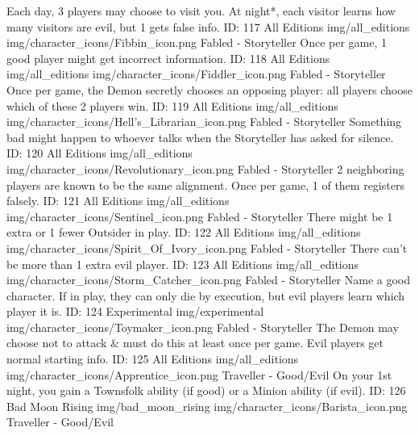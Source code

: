 	{Each day, 3 players may choose to visit you. At night*, each visitor learns how many visitors are evil, but 1 gets false info.}        
	{ID: 117}
	{All Editions}
	{img/all_editions}
	{img/character_icons/Fibbin_icon.png}
	{\color{storytellercolor}Fabled - Storyteller}
	{Once per game, 1 good player might get incorrect information.}        
	{ID: 118}
	{All Editions}
	{img/all_editions}
	{img/character_icons/Fiddler_icon.png}
	{\color{storytellercolor}Fabled - Storyteller}
	{Once per game, the Demon secretly chooses an opposing player: all players choose which of these 2 players win.}        
	{ID: 119}
	{All Editions}
	{img/all_editions}
	{img/character_icons/Hell's_Librarian_icon.png}
	{\color{storytellercolor}Fabled - Storyteller}
	{Something bad might happen to whoever talks when the Storyteller has asked for silence.}        
	{ID: 120}
	{All Editions}
	{img/all_editions}
	{img/character_icons/Revolutionary_icon.png}
	{\color{storytellercolor}Fabled - Storyteller}
	{2 neighboring players are known to be the same alignment. Once per game, 1 of them registers falsely.}        
	{ID: 121}
	{All Editions}
	{img/all_editions}
	{img/character_icons/Sentinel_icon.png}
	{\color{storytellercolor}Fabled - Storyteller}
	{There might be 1 extra or 1 fewer Outsider in play.}        
	{ID: 122}
	{All Editions}
	{img/all_editions}
	{img/character_icons/Spirit_Of_Ivory_icon.png}
	{\color{storytellercolor}Fabled - Storyteller}
	{There can't be more than 1 extra evil player.}        
	{ID: 123}
	{All Editions}
	{img/all_editions}
	{img/character_icons/Storm_Catcher_icon.png}
	{\color{storytellercolor}Fabled - Storyteller}
	{Name a good character. If in play, they can only die by execution, but evil players learn which player it is.}        
	{ID: 124}
	{Experimental}
	{img/experimental}
	{img/character_icons/Toymaker_icon.png}
	{\color{storytellercolor}Fabled - Storyteller}
	{The Demon may choose not to attack \& must do this at least once per game. Evil players get normal starting info.}        
	{ID: 125}
	{All Editions}
	{img/all_editions}
	{img/character_icons/Apprentice_icon.png}
	{\color{goodcolor}Traveller \color{evilcolor}- Good/Evil}
	{On your 1st night, you gain a Townsfolk ability (if good) or a Minion ability (if evil).}        
	{ID: 126}
	{Bad Moon Rising}
	{img/bad_moon_rising}
	{img/character_icons/Barista_icon.png}
	{\color{goodcolor}Traveller \color{evilcolor}- Good/Evil}
